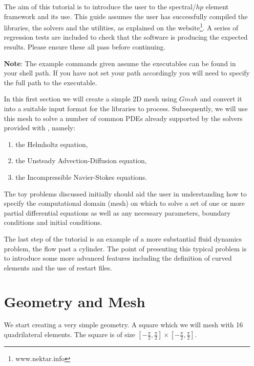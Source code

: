 \documentclass[a4paper,12pt]{article}
\begin{document}
\maketitle

The aim of this tutorial is to introduce the user to the spectral/$hp$
element framework \nektar and its use. This guide assumes
the user has successfully compiled the libraries, the solvers and the utilities,
as explained on the website\footnote{www.nektar.info}. A series of regression
tests are included to check that the software is producing the expected results.
Please ensure these all pass before continuing.

\textbf{Note}: The example commands given assume the \nektar executables can be
found in your shell path. If you have not set your path accordingly you will
need to specify the full path to the \nektar executable.
\bigskip

In this first section we will create a simple 2D mesh using $Gmsh$ and
convert it into a suitable input format for the \nektar
libraries to process. Subsequently, we will use this mesh to solve a number of
common PDEs already supported by the solvers provided with \nektar, namely:
\begin{enumerate}
\item the Helmholtz equation,
\item the Unsteady Advection-Diffusion equation,
\item the Incompressible Navier-Stokes equations. 
\end{enumerate}

The toy problems discussed initially should aid the user in understanding how to
specify the computational domain (mesh) on which to solve a set of one or more
partial differential equations as well as any necessary parameters, boundary
conditions and initial conditions.

The last step of the tutorial is an example of a more substantial fluid
dynamics problem, the flow past a cylinder. The point of presenting this typical
problem is to introduce some more advanced features including the definition of
curved elements and the use of restart files.


\section{Geometry and Mesh}

We start creating a very simple geometry. A square which we will mesh with 16
quadrilateral elements.
The square is of size
$[-\frac{\pi}{2},\frac{\pi}{2}]\times[-\frac{\pi}{2},\frac{\pi}{2}]$.\\
\end{document}
